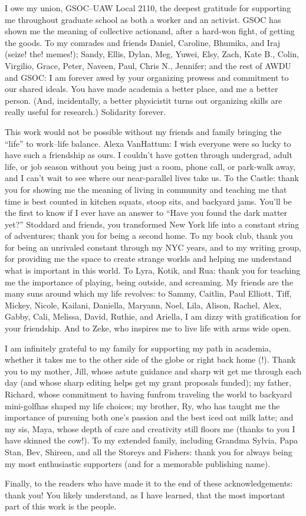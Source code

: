 I owe my union, GSOC--UAW Local 2110, the deepest gratitude for supporting me throughout graduate school as both a worker and an activist. 
GSOC has shown me the meaning of collective action{\emdash}and, after a hard-won fight, of getting the goods.
To my comrades and friends Daniel, Caroline, Bhumika, and Iraj (seize! the! memes!); Sandy, Ellis, Dylan, Meg, Yuwei, Elsy, Zach, Kate B., Colin, Virgilio, Grace, Peter, Naveen, Paul, Chris N., Jennifer; and the rest of AWDU and GSOC: I am forever awed by your organizing prowess and commitment to our shared ideals.
You have made academia a better place, and me a better person. 
(And, incidentally, a better physicist{\emdash}it turns out organizing skills are really useful for research.)
Solidarity forever.

This work would not be possible without my friends and family bringing the ``life'' to work--life balance.
Alexa VanHattum: I wish everyone were so lucky to have such a friendship as ours.
I couldn't have gotten through undergrad, adult life, or job season without you being just a room, phone call, or park-walk away, and I can't wait to see where our near-parallel lives take us.
To the Castle: thank you for showing me the meaning of living in community and teaching me that time is best counted in kitchen squats, stoop sits, and backyard jams.
You'll be the first to know if I ever have an answer to ``Have you found the dark matter yet?''
Stoddard and friends, you transformed New York life into a constant string of adventures; thank you for being a second home.
To my book club, thank you for being an unrivaled constant through my NYC years, and to my writing group, for providing me the space to create strange worlds and helping me understand what is important in this world.
To Lyra, Kotik, and Rua: thank you for teaching me the importance of playing, being outside, and screaming.
My friends are the many suns around which my life revolves: to Sammy, Caitlin, Paul Elliott, Tiff, Mickey, Nicole, Kailani, Daniella, Maryann, Noel, Lila, Alison, Rachel, Alex, Gabby, Cali, Melissa, David, Ruthie, and Ariella, I am dizzy with gratification for your friendship.
And to Zeke, who inspires me to live life with arms wide open.

I am infinitely grateful to my family for supporting my path in academia, whether it takes me to the other side of the globe or right back home (!).
Thank you to my mother, Jill, whose astute guidance and sharp wit get me through each day (and whose sharp editing helps get my grant proposals funded); my father, Richard, whose commitment to having fun{\emdash}from traveling the world to backyard mini-golf{\emdash}has shaped my life choices; my brother, Ry, who has taught me the importance of pursuing both one's passion and the best iced oat milk latte; and my sis, Maya, whose depth of care and creativity still floors me (thanks to you I have skinned the cow!).
To my extended family, including Grandma Sylvia, Papa Stan, Bev, Shireen, and all the Storeys and Fishers: thank you for always being my most enthusiastic supporters (and for a memorable publishing name).

Finally, to the readers who have made it to the end of these acknowledgements: thank you!
You likely understand, as I have learned, that the most important part of this work is the people.